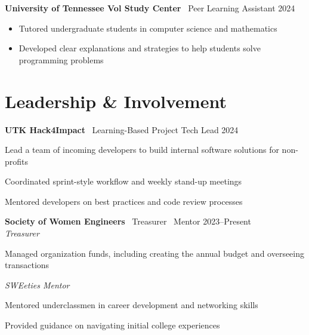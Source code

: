 \documentclass[11pt,a4paper]{article}
\begin{document}
\noindent
\textbf{University of Tennessee Vol Study Center} \textbar\ Peer Learning Assistant \hfill 2024 \vspace{-4pt}
\begin{itemize}[leftmargin=*, topsep=0pt, itemsep=0pt, partopsep=0pt, parsep=0pt]
  \small
  \item Tutored undergraduate students in computer science and mathematics
  \item Developed clear explanations and strategies to help students solve programming problems
\end{itemize}
\vspace{-4pt}

\section*{Leadership \& Involvement}

\noindent
\textbf{UTK Hack4Impact} \textbar\ Learning-Based Project Tech Lead \hfill 2024 \vspace{-4pt}
\begin{itemize}[leftmargin=*, topsep=0pt, itemsep=1pt, partopsep=0pt, parsep=0pt]
  {\small
  \item Lead a team of incoming developers to build internal software solutions for non-profits
  \item Coordinated sprint-style workflow and weekly stand-up meetings
  \item Mentored developers on best practices and code review processes
  }
\end{itemize}
\vspace{-5pt}

\noindent
\textbf{Society of Women Engineers} \textbar\ Treasurer \textbar\ Mentor \hfill 2023--Present \\ [-1pt]
\noindent\textit{Treasurer} \vspace{-6pt}
\begin{itemize}[leftmargin=*, topsep=0pt, itemsep=1pt, partopsep=0pt, parsep=0pt]
  {\small
  \item Managed organization funds, including creating the annual budget and overseeing transactions
  }
\end{itemize}
\vspace{-5pt}

\textit{SWEeties Mentor} \vspace{-6pt}
\begin{itemize}[leftmargin=*, topsep=0pt, itemsep=1pt, partopsep=0pt, parsep=0pt]
  {\small
  \item Mentored underclassmen in career development and networking skills
  \item Provided guidance on navigating initial college experiences
  }
\end{itemize}
\vspace{-5pt}
\end{document}
